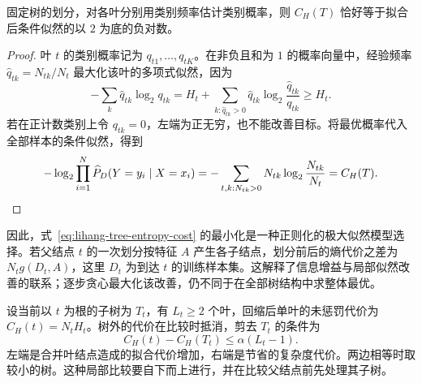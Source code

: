 \begin{proposition}[熵代价的似然解释]
固定树的划分，对各叶分别用类别频率估计类别概率，则 $C_H(T)$ 恰好等于拟合后条件似然的以 $2$ 为底的负对数。
\end{proposition}
\begin{proof}
叶 $t$ 的类别概率记为 $q_{t1},\ldots,q_{tK}$。在非负且和为 $1$ 的概率向量中，经验频率 $\widehat q_{tk}=N_{tk}/N_t$ 最大化该叶的多项式似然，因为
\[
  -\sum_k\widehat q_{tk}\log_2q_{tk}
  =H_t+\sum_{k:\widehat q_{tk}>0}\widehat q_{tk}
  \log_2\frac{\widehat q_{tk}}{q_{tk}}\geq H_t.
\]
若在正计数类别上令 $q_{tk}=0$，左端为正无穷，也不能改善目标。将最优概率代入全部样本的条件似然，得到
\[
  -\log_2\prod_{i=1}^N\widehat P_D(Y=y_i\mid X=x_i)
  =-\sum_{t,k:N_{tk}>0}N_{tk}\log_2\frac{N_{tk}}{N_t}
  =C_H(T).\qedhere
\]
\end{proof}

因此，式~\eqref{eq:lihang-tree-entropy-cost} 的最小化是一种正则化的极大似然模型选择。若父结点 $t$ 的一次划分按特征 $A$ 产生各子结点，划分前后的熵代价之差为 $N_tg(D_t,A)$，这里 $D_t$ 为到达 $t$ 的训练样本集。这解释了信息增益与局部似然改善的联系；逐步贪心最大化该改善，仍不同于在全部树结构中求整体最优。

设当前以 $t$ 为根的子树为 $T_t$，有 $L_t\geq2$ 个叶，回缩后单叶的未惩罚代价为 $C_H(t)=N_tH_t$。树外的代价在比较时抵消，剪去 $T_t$ 的条件为
\begin{equation}
  C_H(t)-C_H(T_t)\leq\alpha(L_t-1).
  \label{eq:lihang-tree-local-pruning}
\end{equation}
左端是合并叶结点造成的拟合代价增加，右端是节省的复杂度代价。两边相等时取较小的树。这种局部比较要自下而上进行，并在比较父结点前先处理其子树。

